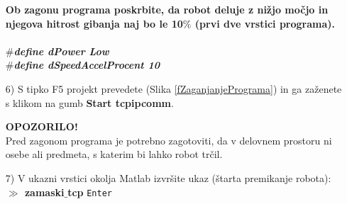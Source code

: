 \begin{enumerate}
\begin{mdframed}[backgroundcolor=red!80, shadow=true,roundcorner=8pt]
        \vspace{0.1cm}
 \textbf{Ob zagonu programa poskrbite, da robot deluje %
 z nižjo močjo in njegova hitrost gibanja naj bo le 10$\%$ (prvi dve vrstici programa).}
 \\
 \\
\hspace*{3.5cm}\textcolor[rgb]{1.00,1.00,0.00}{\emph{\textbf{$\#$define dPower Low}}} \\ %
\hspace*{3.5cm}\textcolor[rgb]{1.00,1.00,0.00}{\emph{\textbf{$\#$define dSpeedAccelProcent 10}}} \\ %
        \vspace{-0.3cm}
\end{mdframed}
\vspace{0.3cm}

\item[6)] S tipko F5 projekt prevedete
(Slika \ref{fZaganjanjePrograma}) in ga zaženete s klikom na gumb \textbf{Start tcpipcomm}. %

\vspace{0.3cm}
\begin{mdframed}[backgroundcolor=red!80, shadow=true,roundcorner=8pt]
        \vspace{0.1cm}
        \center
        \large
\textcolor[rgb]{1.00,1.00,0.00}{\LARGE\textbf{OPOZORILO!}}\\ %
\textcolor[rgb]{1.00,1.00,0.00}{\large Pred zagonom programa je
potrebno zagotoviti, da v delovnem prostoru ni osebe ali predmeta, s
katerim bi lahko robot trčil.} \\ %
        \vspace{0.1cm}
\end{mdframed}
\vspace{0.3cm}
\item[7)] V ukazni vrstici okolja Matlab izvršite ukaz (štarta premikanje robota): \\ %

\vspace{-0.1cm} %
\textbf{$\gg$ zamaski$\_$tcp} \verb"Enter" \\ %
\normalsize
\end{enumerate}
